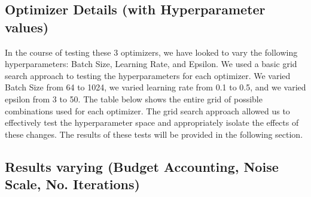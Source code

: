 \subsection{Optimizer Details (with Hyperparameter values)}\label{subsec:optimizer-details}
In the course of testing these 3 optimizers, we have looked to vary the following hyperparameters: Batch Size, Learning Rate, and Epsilon. We used a basic grid search
approach to testing the hyperparameters for each optimizer. We varied Batch Size from 64 to 1024, we varied learning rate from 0.1 to 0.5, and we varied epsilon from 3 to 50. The
table below shows the entire grid of possible combinations used for each optimizer. The grid search approach allowed us to effectively test the hyperparameter space and appropriately
isolate the effects of these changes. The results of these tests will be provided in the following section.


\subsection{Results varying (Budget Accounting, Noise Scale, No. Iterations)}\label{subsec:dp-details}

